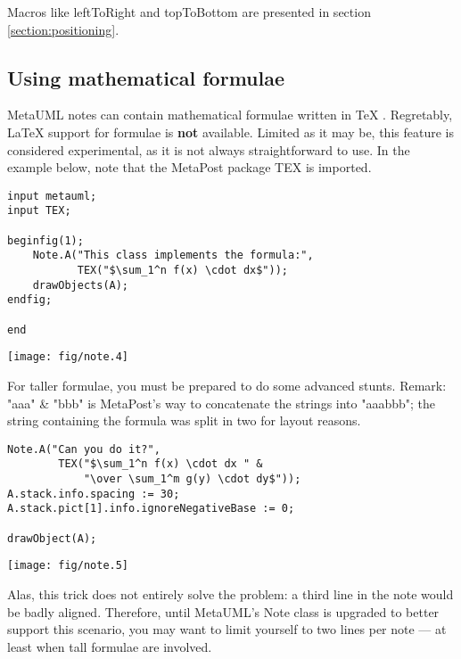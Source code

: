 \documentclass{article}
\newcommand{\code}{\ttfamily}
\begin{document}
Macros like {\code leftToRight} and {\code topToBottom} are presented in section \ref{section:positioning}.

\subsection{Using mathematical formulae}

MetaUML notes can contain mathematical formulae written in TeX \cite{texbook}. Regretably, LaTeX \cite{latexbook} support for formulae is {\bf not} available.
Limited as it may be, this feature is considered experimental, as it is not always straightforward to use. In the example below, note that the MetaPost package {\code TEX} is imported.

\begin{multicols}{2}
\begin{verbatim}
input metauml;
input TEX;

beginfig(1);
    Note.A("This class implements the formula:", 
           TEX("$\sum_1^n f(x) \cdot dx$"));
    drawObjects(A);
endfig;

end
\end{verbatim}
\columnbreak
\hspace{0.5cm}\texttt{[image: fig/note.4]}
\end{multicols}

For taller formulae, you must be prepared to do some advanced stunts. Remark: {\code "aaa" \& "bbb"} is MetaPost's way to concatenate the strings into {\code "aaabbb"};
the string containing the formula was split in two for layout reasons.

\begin{multicols}{2}
\begin{verbatim}
Note.A("Can you do it?", 
        TEX("$\sum_1^n f(x) \cdot dx " &
            "\over \sum_1^m g(y) \cdot dy$"));
A.stack.info.spacing := 30;
A.stack.pict[1].info.ignoreNegativeBase := 0;

drawObject(A);
\end{verbatim}
\columnbreak
\hspace{3cm}\texttt{[image: fig/note.5]}
\end{multicols}

Alas, this trick does not entirely solve the problem: a third line in the note would be badly aligned. Therefore,
until MetaUML's {\code Note} class is upgraded to better support this scenario, you may want to limit yourself 
to two lines per note --- at least when tall formulae are involved.
\end{document}
